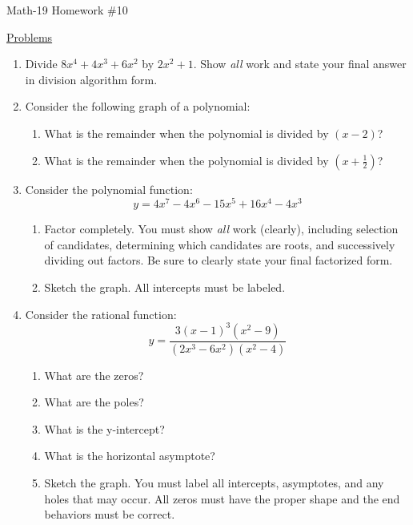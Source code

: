 \documentclass[letterpaper,12pt,fleqn]{article}
\begin{document}
\begin{center}
\Large Math-19 Homework \#10
\end{center}

\vspace{0.5in}

\underline{Problems}

\begin{enumerate}
\item Divide $8x^4+4x^3+6x^2$ by $2x^2+1$. Show \emph{all} work and state your
  final answer in division algorithm form.

\item Consider the following graph of a polynomial:


  \begin{enumerate}
  \item What is the remainder when the polynomial is divided by $(x-2)$?
  \item What is the remainder when the polynomial is divided by
    $\left(x+\frac{1}{2}\right)$?
  \end{enumerate}

\item Consider the polynomial function:
  \[y=4x^7-4x^6-15x^5+16x^4-4x^3\]
  \begin{enumerate}
  \item Factor completely. You must show \emph{all} work (clearly), including
    selection of candidates, determining which candidates are roots, and
    successively dividing out factors. Be sure to clearly state your final
    factorized form.

  \item Sketch the graph. All intercepts must be labeled.
  \end{enumerate}

  \newpage

\item Consider the rational function:
  \[y=\frac{3(x-1)^3(x^2-9)}{(2x^3-6x^2)(x^2-4)}\]
  \begin{enumerate}
  \item What are the zeros?
  \item What are the poles?
  \item What is the y-intercept?
  \item What is the horizontal asymptote?
  \item Sketch the graph. You must label all intercepts, asymptotes, and any
    holes that may occur. All zeros must have the proper shape and the end
    behaviors must be correct.
  \end{enumerate}
\end{enumerate}
\end{document}
